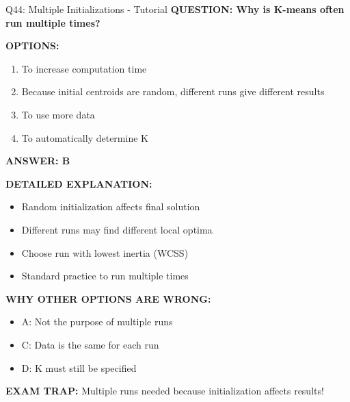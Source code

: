 \documentclass[8pt]{beamer}
\begin{document}
	\begin{frame}{Q44: Multiple Initializations - Tutorial}
		\fontsize{6.5}{7.5}\selectfont
		\textbf{QUESTION: Why is K-means often run multiple times?}
		
		\vspace{0.1cm}
		\textbf{OPTIONS:}
		\begin{enumerate}
			\item To increase computation time
			\item Because initial centroids are random, different runs give different results
			\item To use more data
			\item To automatically determine K
		\end{enumerate}
		
		\vspace{0.1cm}
		\textcolor{myblue}{\textbf{ANSWER: B}}
		
		\vspace{0.1cm}
		\textbf{DETAILED EXPLANATION:}
		\begin{itemize}
			\item Random initialization affects final solution
			\item Different runs may find different local optima
			\item Choose run with lowest inertia (WCSS)
			\item Standard practice to run multiple times
		\end{itemize}
		
		\vspace{0.1cm}
		\textcolor{myred}{\textbf{WHY OTHER OPTIONS ARE WRONG:}}
		\begin{itemize}
			\item \textcolor{myred}{A:} Not the purpose of multiple runs
			\item \textcolor{myred}{C:} Data is the same for each run
			\item \textcolor{myred}{D:} K must still be specified
		\end{itemize}
		
		\textcolor{myred}{\textbf{EXAM TRAP:}} Multiple runs needed because \textcolor{myblue}{initialization affects results}!
	\end{frame}
	
\end{document}
